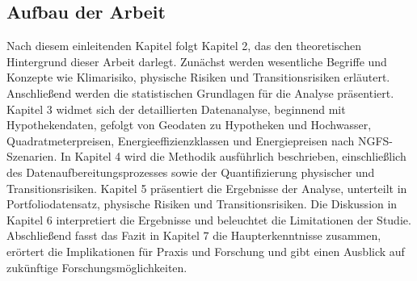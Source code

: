 \subsection{Aufbau der Arbeit}
Nach diesem einleitenden Kapitel folgt Kapitel 2, das den theoretischen Hintergrund dieser Arbeit darlegt. Zunächst werden wesentliche Begriffe und Konzepte wie Klimarisiko, physische Risiken und Transitionsrisiken erläutert. Anschließend werden die statistischen Grundlagen für die Analyse präsentiert. Kapitel 3 widmet sich der detaillierten Datenanalyse, beginnend mit Hypothekendaten, gefolgt von Geodaten zu Hypotheken und Hochwasser, Quadratmeterpreisen, Energieeffizienzklassen und Energiepreisen nach NGFS-Szenarien. In Kapitel 4 wird die Methodik ausführlich beschrieben, einschließlich des Datenaufbereitungsprozesses sowie der Quantifizierung physischer und Transitionsrisiken. Kapitel 5 präsentiert die Ergebnisse der Analyse, unterteilt in Portfoliodatensatz, physische Risiken und Transitionsrisiken. Die Diskussion in Kapitel 6 interpretiert die Ergebnisse und beleuchtet die Limitationen der Studie. Abschließend fasst das Fazit in Kapitel 7 die Haupterkenntnisse zusammen, erörtert die Implikationen für Praxis und Forschung und gibt einen Ausblick auf zukünftige Forschungsmöglichkeiten.